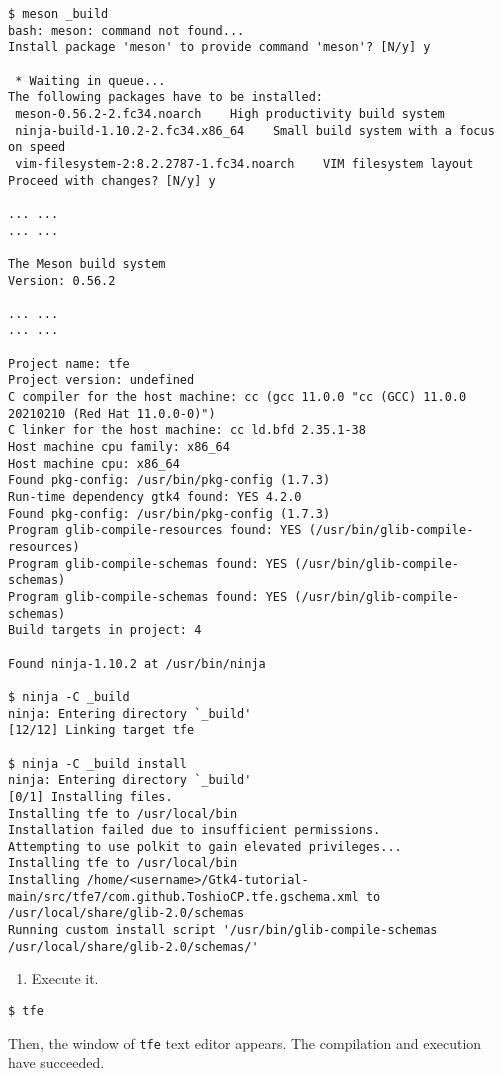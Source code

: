 \begin{lstlisting}
$ meson _build
bash: meson: command not found...
Install package 'meson' to provide command 'meson'? [N/y] y

 * Waiting in queue...
The following packages have to be installed:
 meson-0.56.2-2.fc34.noarch    High productivity build system
 ninja-build-1.10.2-2.fc34.x86_64    Small build system with a focus on speed
 vim-filesystem-2:8.2.2787-1.fc34.noarch    VIM filesystem layout
Proceed with changes? [N/y] y

... ...
... ...

The Meson build system
Version: 0.56.2

... ...
... ...

Project name: tfe
Project version: undefined
C compiler for the host machine: cc (gcc 11.0.0 "cc (GCC) 11.0.0 20210210 (Red Hat 11.0.0-0)")
C linker for the host machine: cc ld.bfd 2.35.1-38
Host machine cpu family: x86_64
Host machine cpu: x86_64
Found pkg-config: /usr/bin/pkg-config (1.7.3)
Run-time dependency gtk4 found: YES 4.2.0
Found pkg-config: /usr/bin/pkg-config (1.7.3)
Program glib-compile-resources found: YES (/usr/bin/glib-compile-resources)
Program glib-compile-schemas found: YES (/usr/bin/glib-compile-schemas)
Program glib-compile-schemas found: YES (/usr/bin/glib-compile-schemas)
Build targets in project: 4

Found ninja-1.10.2 at /usr/bin/ninja

$ ninja -C _build
ninja: Entering directory `_build'
[12/12] Linking target tfe

$ ninja -C _build install
ninja: Entering directory `_build'
[0/1] Installing files.
Installing tfe to /usr/local/bin
Installation failed due to insufficient permissions.
Attempting to use polkit to gain elevated privileges...
Installing tfe to /usr/local/bin
Installing /home/<username>/Gtk4-tutorial-main/src/tfe7/com.github.ToshioCP.tfe.gschema.xml to /usr/local/share/glib-2.0/schemas
Running custom install script '/usr/bin/glib-compile-schemas /usr/local/share/glib-2.0/schemas/'
\end{lstlisting}

\begin{enumerate}
\def\labelenumi{\arabic{enumi}.}
\setcounter{enumi}{7}
\tightlist
\item
  Execute it.
\end{enumerate}

\begin{lstlisting}
$ tfe
\end{lstlisting}

Then, the window of \passthrough{\lstinline!tfe!} text editor appears.
The compilation and execution have succeeded.
